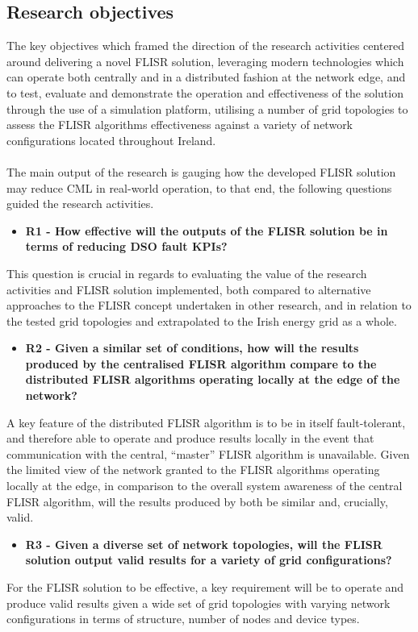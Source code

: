 \subsection{Research objectives}
\label{sec:objectives}

The key objectives which framed the direction of the research activities centered around delivering a novel FLISR solution, leveraging modern technologies
which can operate both centrally and in a distributed fashion at the network edge, and to test, evaluate and demonstrate the operation and effectiveness of the solution through
the use of a simulation platform, utilising a number of grid topologies to assess the FLISR algorithms effectiveness against a variety of network configurations located throughout Ireland.
\\
\\
The main output of the research is gauging how the developed FLISR solution may reduce CML in real-world operation, to that end, the following questions guided the research activities.

\begin{itemize}
  \item \textbf{R1 - How effective will the outputs of the FLISR solution be in terms of reducing DSO fault KPIs?}
\end{itemize}

\noindent
This question is crucial in regards to evaluating the value of the research activities and FLISR solution implemented, both compared to alternative approaches to the FLISR concept
undertaken in other research, and in relation to the tested grid topologies and extrapolated to the Irish energy grid as a whole.

\begin{itemize}
  \item \textbf{R2 - Given a similar set of conditions, how will the results produced by the centralised FLISR algorithm compare to the distributed FLISR algorithms operating locally at the edge of the network?}
\end{itemize}

\noindent
A key feature of the distributed FLISR algorithm is to be in itself fault-tolerant, and therefore able to operate and produce results locally in the event that communication with the central,
``master'' FLISR algorithm is unavailable. Given the limited view of the network granted to the FLISR algorithms operating locally at the edge,
in comparison to the overall system awareness of the central FLISR algorithm, will the results produced by both be similar and, crucially, valid.

\begin{itemize}
  \item \textbf{R3 - Given a diverse set of network topologies, will the FLISR solution output valid results for a variety of grid configurations?}
\end{itemize}

\noindent
For the FLISR solution to be effective, a key requirement will be to operate and produce valid results given a wide set of grid topologies with varying network configurations in terms
of structure, number of nodes and device types.

\clearpage

